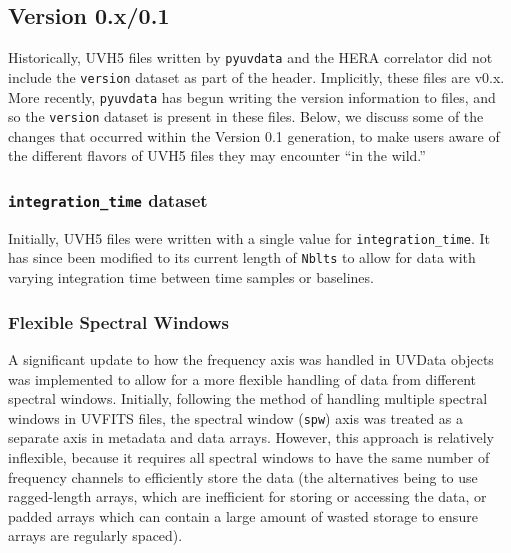 \documentclass[11pt, oneside]{article}
\begin{document}
\subsection{Version 0.x/0.1}
Historically, UVH5 files written by \verb+pyuvdata+ and the HERA correlator did
not include the \verb+version+ dataset as part of the header. Implicitly, these
files are v0.x. More recently, \verb+pyuvdata+ has begun writing the version
information to files, and so the \verb+version+ dataset is present in these
files. Below, we discuss some of the changes that occurred within the Version
0.1 generation, to make users aware of the different flavors of UVH5 files they
may encounter ``in the wild.''

\subsubsection{\texttt{integration\_time} dataset}
Initially, UVH5 files were written with a single value for
\verb+integration_time+. It has since been modified to its current length of
\verb+Nblts+ to allow for data with varying integration time between time
samples or baselines.

\subsubsection{Flexible Spectral Windows}
\label{sec:flex_spw}
A significant update to how the frequency axis was handled in UVData objects was
implemented to allow for a more flexible handling of data from different
spectral windows. Initially, following the method of handling multiple spectral
windows in UVFITS files, the spectral window (\verb+spw+) axis was treated as a
separate axis in metadata and data arrays. However, this approach is relatively
inflexible, because it requires all spectral windows to have the same number of
frequency channels to efficiently store the data (the alternatives being to use
ragged-length arrays, which are inefficient for storing or accessing the data,
or padded arrays which can contain a large amount of wasted storage to ensure
arrays are regularly spaced).
\end{document}
